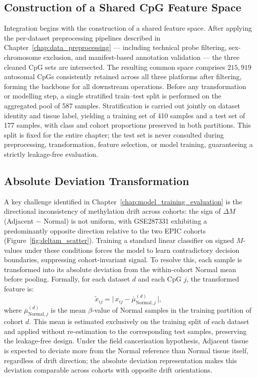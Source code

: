 \subsection{Construction of a Shared CpG Feature Space}
Integration begins with the construction of a shared feature space.
After applying the per-dataset preprocessing pipelines described in
Chapter~\ref{chap:data_preprocessing} --- including technical probe filtering,
sex-chromosome exclusion, and manifest-based annotation validation ---
the three cleaned CpG sets are intersected.
The resulting common space comprises $215{,}919$ autosomal CpGs consistently
retained across all three platforms after filtering, forming the backbone for
all downstream operations.
Before any transformation or modelling step, a single stratified train--test
split is performed on the aggregated pool of 587 samples.
Stratification is carried out jointly on dataset identity and tissue label,
yielding a training set of 410 samples and a test set of 177 samples,
with class and cohort proportions preserved in both partitions.
This split is fixed for the entire chapter; the test set is never consulted
during preprocessing, transformation, feature selection, or model training,
guaranteeing a strictly leakage-free evaluation.

\subsection{Absolute Deviation Transformation}

A key challenge identified in Chapter~\ref{chap:model_training_evaluation} is the directional
inconsistency of methylation drift across cohorts: the sign of
$\Delta M$ (Adjacent $-$ Normal) is not uniform, with GSE287331 exhibiting a
predominantly opposite direction relative to the two EPIC cohorts
(Figure~\ref{fig:deltam_scatter}).
Training a standard linear classifier on signed $M$-values under these conditions
forces the model to learn contradictory decision boundaries, suppressing
cohort-invariant signal.
To resolve this, each sample is transformed into its absolute deviation from the
within-cohort Normal mean before pooling.
Formally, for each dataset $d$ and each CpG $j$, the transformed feature is:
\begin{equation}
  \tilde{x}_{ij} = \bigl|\, x_{ij} - \bar{\mu}^{(d)}_{\mathrm{Normal},j} \,\bigr|,
\end{equation}
where $\bar{\mu}^{(d)}_{\mathrm{Normal},j}$ is the mean $\beta$-value of Normal
samples in the training partition of cohort $d$.
This mean is estimated exclusively on the training split of each dataset and
applied without re-estimation to the corresponding test samples, preserving the
leakage-free design.
Under the field cancerisation hypothesis, Adjacent tissue is expected to deviate
more from the Normal reference than Normal tissue itself, regardless of drift
direction; the absolute deviation representation makes this deviation comparable
across cohorts with opposite drift orientations.

